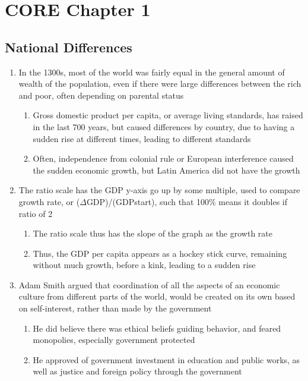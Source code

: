 \section{CORE Chapter 1}

\subsection{National Differences}
\begin{enumerate}
\item In the 1300s, most of the world was fairly equal in the general amount of wealth of the population, even if there
were large differences between the rich and poor, often depending on parental status
\begin{enumerate}
\item Gross domestic product per capita, or average living standards, has raised in the last 700 years, but caused
differences by country, due to having a sudden rise at different times, leading to different standards
\item Often, independence from colonial rule or European interference caused the sudden economic growth, but Latin
America did not have the growth
\end{enumerate}
\item The ratio scale has the GDP y{}-axis go up by some multiple, used to compare growth rate, or (${\Delta}$GDP)/(GDPstart), such that 100\% means it doubles if ratio of 2
\begin{enumerate}
\item The ratio scale thus has the slope of the graph as the growth rate
\item Thus, the GDP per capita appears as a hockey stick curve, remaining without much growth, before a kink, leading to
a sudden rise
\end{enumerate}
\item Adam Smith argued that coordination of all the aspects of an economic culture from different parts of the world,
would be created on its own based on self{}-interest, rather than made by the government
\begin{enumerate}
\item He did believe there was ethical beliefs guiding behavior, and feared monopolies, especially government protected
\item He approved of government investment in education and public works, as well as justice and foreign policy through
the government
\end{enumerate}
\end{enumerate}

